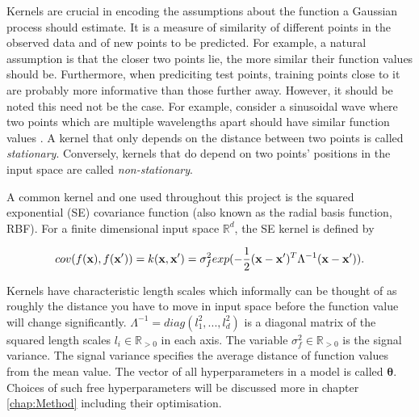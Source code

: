 \documentclass[12pt,a4paper]{report}
\theoremstyle{definition}
\begin{document}
Kernels are crucial in encoding the assumptions about the function a Gaussian process should estimate. 
It is a measure of similarity of different points in the observed data and of new points to be predicted. 
For example, a natural assumption is that the closer two points lie, the more similar their function values should be. 
Furthermore, when prediciting test points, training points close to it are probably more informative than those further away. 
However, it should be noted this need not be the case. 
For example, consider a sinusoidal wave where two points which are multiple wavelengths apart should have similar function values \citep{Kaiser2017}.
A kernel that only depends on the distance between two points is called \emph{stationary}.
Conversely, kernels that do depend on two points' positions in the input space are called \emph{non-stationary}.

A common kernel and one used throughout this project is the squared exponential (SE) covariance function (also known as the radial basis function, RBF). 
For a finite dimensional input space $\mathbb{R}^d$, the SE kernel is defined by

\begin{equation}
	\centering
	cov(f(\textbf{x}), f(\textbf{x}')) = k(\textbf{x}, \textbf{x}') = \sigma_{f}^2 exp(-\frac{1}{2} (\textbf{x} - \textbf{x}')^T \Lambda^{-1} (\textbf{x} - \textbf{x}')).
	\label{eq:SquaredExponentialKernel}
\end{equation}

Kernels have characteristic length scales which informally can be thought of as roughly the distance you have to move in input space before the function value will change significantly. 
$\Lambda^{-1}  = diag(l_{1}^2, ... , l_{d}^2)$ is a diagonal matrix of the squared length scales $l_{i} \in \mathbb{R}_{>0}$ in each axis.
The variable $\sigma_{f}^2 \in \mathbb{R}_{>0}$ is the signal variance.
The signal variance specifies the average distance of function values from the mean value.
The vector of all hyperparameters in a model is called $\boldsymbol{\theta}$.
Choices of such free hyperparameters will be discussed more in chapter \ref{chap:Method} including their optimisation. 
\end{document}
